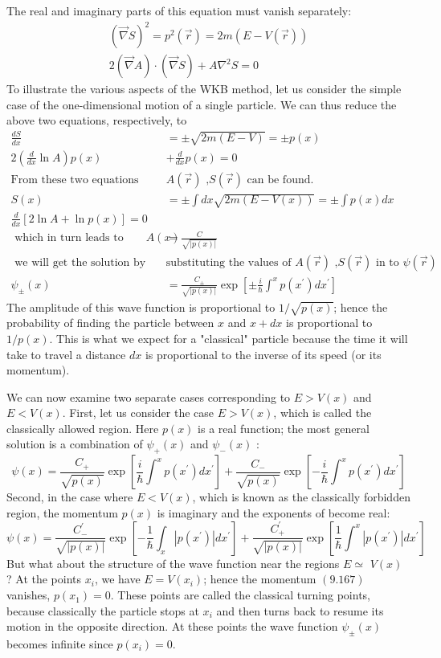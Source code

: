 The real and imaginary parts of this equation must vanish separately:
$$
\begin{gathered}
(\vec{\nabla} S)^{2}=p^{2}(\vec{r})=2 m(E-V(\vec{r})) \\
2(\vec{\nabla} A) \cdot(\vec{\nabla} S)+A \nabla^{2} S=0
\end{gathered}
$$
To illustrate the various aspects of the WKB method, let us consider the simple case of the one-dimensional motion of a single particle. We can thus reduce the above two equations, respectively, to
	$$
	\begin{aligned}
		\frac{d S}{d x}&=\pm \sqrt{2 m(E-V)}=\pm p(x) \\
		2\left(\frac{d}{d x} \ln A\right) p(x)&+\frac{d}{d x} p(x)=0\\
	\text{From these two equations }&\text{$A(\vec{r})$ ,$S(\vec{r})$ can be found.}\\
	S(x)&=\pm \int d x \sqrt{2 m(E-V(x))}=\pm \int p(x) d x\\
	\frac{d}{d x}[2 \ln A+\ln p(x)]=0\\
\text{	which in turn leads to}\qquad
	A(x)&=\frac{C}{\sqrt{|p(x)|}}\\
\text{	we will get the solution by }&\text{substituting the values of $A(\vec{r})$ ,$S(\vec{r})$ in to }	\psi(\vec{r})\\
	\psi_{\pm}(x)&=\frac{C_{\pm}}{\sqrt{|p(x)|}} \exp \left[\pm \frac{i}{\hbar} \int^{x} p\left(x^{\prime}\right) d x^{\prime}\right] 
\end{aligned}
$$
The amplitude of this wave function is proportional to $1 / \sqrt{p(x)}$; hence the probability of finding the particle between $x$ and $x+d x$ is proportional to $1 / p(x)$. This is what we expect for a "classical" particle because the time it will take to travel a distance $d x$ is proportional to the inverse of its speed (or its momentum).
\par We can now examine two separate cases corresponding to $E>V(x)$ and $E<V(x)$. First, let us consider the case $E>V(x)$, which is called the classically allowed region. Here $p(x)$ is a real function; the most general solution  is a combination of $\psi_{+}(x)$ and $\psi_{-}(x)$ :
$$
\psi(x)=\frac{C_{+}}{\sqrt{p(x)}} \exp \left[\frac{i}{\hbar} \int^{x} p\left(x^{\prime}\right) d x^{\prime}\right]+\frac{C_{-}}{\sqrt{p(x)}} \exp \left[-\frac{i}{\hbar} \int^{x} p\left(x^{\prime}\right) d x^{\prime}\right]
$$
Second, in the case where $E<V(x)$, which is known as the classically forbidden region, the momentum $p(x)$ is imaginary and the exponents of become real:
$$
\psi(x)=\frac{C_{-}^{\prime}}{\sqrt{|p(x)|}} \exp \left[-\frac{1}{\hbar} \int_{x}\left|p\left(x^{\prime}\right)\right| d x^{\prime}\right]+\frac{C_{+}^{\prime}}{\sqrt{|p(x)|}} \exp \left[\frac{1}{\hbar} \int^{x}\left|p\left(x^{\prime}\right)\right| d x^{\prime}\right]
$$
But what about the structure of the wave function near the regions $E \simeq$ $V(x)$ ? At the points $x_{i}$, we have $E=V\left(x_{i}\right)$; hence the momentum $(9.167)$ vanishes, $p\left(x_{1}\right)=0$. These points are called the classical turning points, because classically the particle stops at $x_{i}$ and then turns back to resume its motion in the opposite direction. At these points the wave function $\psi_{\pm}(x)$ becomes infinite since $p\left(x_{i}\right)=0$. 
